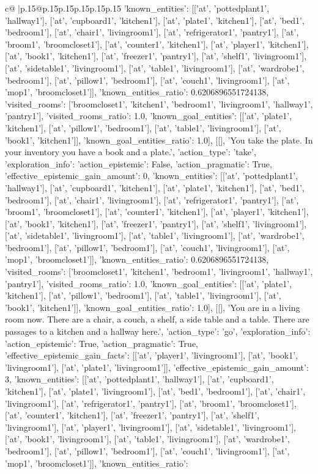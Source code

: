\documentclass{article}
\begin{document}
{\begin{supertabular}{c@{$\;$}|p{.15\linewidth}@{}p{.15\linewidth}p{.15\linewidth}p{.15\linewidth}p{.15\linewidth}p{.15\linewidth}}
{{{'known_entities': [['at', 'pottedplant1', 'hallway1'], ['at', 'cupboard1', 'kitchen1'], ['at', 'plate1', 'kitchen1'], ['at', 'bed1', 'bedroom1'], ['at', 'chair1', 'livingroom1'], ['at', 'refrigerator1', 'pantry1'], ['at', 'broom1', 'broomcloset1'], ['at', 'counter1', 'kitchen1'], ['at', 'player1', 'kitchen1'], ['at', 'book1', 'kitchen1'], ['at', 'freezer1', 'pantry1'], ['at', 'shelf1', 'livingroom1'], ['at', 'sidetable1', 'livingroom1'], ['at', 'table1', 'livingroom1'], ['at', 'wardrobe1', 'bedroom1'], ['at', 'pillow1', 'bedroom1'], ['at', 'couch1', 'livingroom1'], ['at', 'mop1', 'broomcloset1']], 'known_entities_ratio': 0.6206896551724138, 'visited_rooms': ['broomcloset1', 'kitchen1', 'bedroom1', 'livingroom1', 'hallway1', 'pantry1'], 'visited_rooms_ratio': 1.0, 'known_goal_entities': [['at', 'plate1', 'kitchen1'], ['at', 'pillow1', 'bedroom1'], ['at', 'table1', 'livingroom1'], ['at', 'book1', 'kitchen1']], 'known_goal_entities_ratio': 1.0}}], [[], 'You take the plate. In your inventory you have a book and a plate.', {'action_type': 'take', 'exploration_info': {'action_epistemic': False, 'action_pragmatic': True, 'effective_epistemic_gain_amount': 0, 'known_entities': [['at', 'pottedplant1', 'hallway1'], ['at', 'cupboard1', 'kitchen1'], ['at', 'plate1', 'kitchen1'], ['at', 'bed1', 'bedroom1'], ['at', 'chair1', 'livingroom1'], ['at', 'refrigerator1', 'pantry1'], ['at', 'broom1', 'broomcloset1'], ['at', 'counter1', 'kitchen1'], ['at', 'player1', 'kitchen1'], ['at', 'book1', 'kitchen1'], ['at', 'freezer1', 'pantry1'], ['at', 'shelf1', 'livingroom1'], ['at', 'sidetable1', 'livingroom1'], ['at', 'table1', 'livingroom1'], ['at', 'wardrobe1', 'bedroom1'], ['at', 'pillow1', 'bedroom1'], ['at', 'couch1', 'livingroom1'], ['at', 'mop1', 'broomcloset1']], 'known_entities_ratio': 0.6206896551724138, 'visited_rooms': ['broomcloset1', 'kitchen1', 'bedroom1', 'livingroom1', 'hallway1', 'pantry1'], 'visited_rooms_ratio': 1.0, 'known_goal_entities': [['at', 'plate1', 'kitchen1'], ['at', 'pillow1', 'bedroom1'], ['at', 'table1', 'livingroom1'], ['at', 'book1', 'kitchen1']], 'known_goal_entities_ratio': 1.0}}], [[], 'You are in a living room now. There are a chair, a couch, a shelf, a side table and a table. There are passages to a kitchen and a hallway here.', {'action_type': 'go', 'exploration_info': {'action_epistemic': True, 'action_pragmatic': True, 'effective_epistemic_gain_facts': [['at', 'player1', 'livingroom1'], ['at', 'book1', 'livingroom1'], ['at', 'plate1', 'livingroom1']], 'effective_epistemic_gain_amount': 3, 'known_entities': [['at', 'pottedplant1', 'hallway1'], ['at', 'cupboard1', 'kitchen1'], ['at', 'plate1', 'livingroom1'], ['at', 'bed1', 'bedroom1'], ['at', 'chair1', 'livingroom1'], ['at', 'refrigerator1', 'pantry1'], ['at', 'broom1', 'broomcloset1'], ['at', 'counter1', 'kitchen1'], ['at', 'freezer1', 'pantry1'], ['at', 'shelf1', 'livingroom1'], ['at', 'player1', 'livingroom1'], ['at', 'sidetable1', 'livingroom1'], ['at', 'book1', 'livingroom1'], ['at', 'table1', 'livingroom1'], ['at', 'wardrobe1', 'bedroom1'], ['at', 'pillow1', 'bedroom1'], ['at', 'couch1', 'livingroom1'], ['at', 'mop1', 'broomcloset1']], 'known_entities_ratio': }}}
\end{supertabular}}
\end{document}
